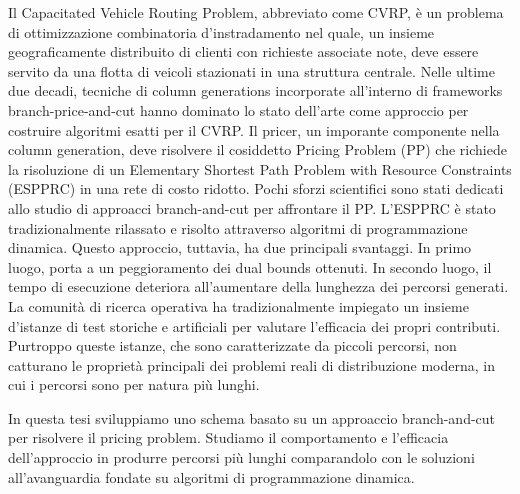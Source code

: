 \noindent Il Capacitated Vehicle Routing Problem, abbreviato come CVRP,
è un problema di ottimizzazione combinatoria d'instradamento nel quale,
un insieme geograficamente distribuito di clienti con richieste associate note,
deve essere servito da una flotta di veicoli stazionati in una struttura centrale.
Nelle ultime due decadi,
tecniche di column generations incorporate all'interno di frameworks branch-price-and-cut
hanno dominato lo stato dell'arte come approccio
per costruire algoritmi esatti per il CVRP.
Il pricer, un imporante componente nella column generation, deve risolvere
il cosiddetto Pricing Problem (PP) che richiede la risoluzione di un
Elementary Shortest Path Problem with Resource Constraints (ESPPRC)
in una rete di costo ridotto.
Pochi sforzi scientifici sono stati dedicati allo studio di approacci
branch-and-cut per affrontare il PP.
L'ESPPRC è stato tradizionalmente rilassato e risolto attraverso algoritmi di programmazione dinamica.
Questo approccio, tuttavia, ha due principali svantaggi.
In primo luogo, porta a un peggioramento dei dual bounds ottenuti.
In secondo luogo, il tempo di esecuzione deteriora all'aumentare della lunghezza dei percorsi generati.
La comunità di ricerca operativa ha tradizionalmente impiegato
un insieme d'istanze di test storiche e artificiali per valutare
l'efficacia dei propri contributi.
Purtroppo queste istanze, che sono caratterizzate da piccoli percorsi,
non catturano le proprietà principali dei problemi reali di distribuzione moderna,
in cui i percorsi sono per natura più lunghi.

\noindent In questa tesi sviluppiamo
uno schema basato su un approaccio branch-and-cut per risolvere il pricing problem.
Studiamo il comportamento e l'efficacia dell'approccio in produrre percorsi più lunghi
comparandolo con le soluzioni all'avanguardia fondate su algoritmi di programmazione dinamica.
